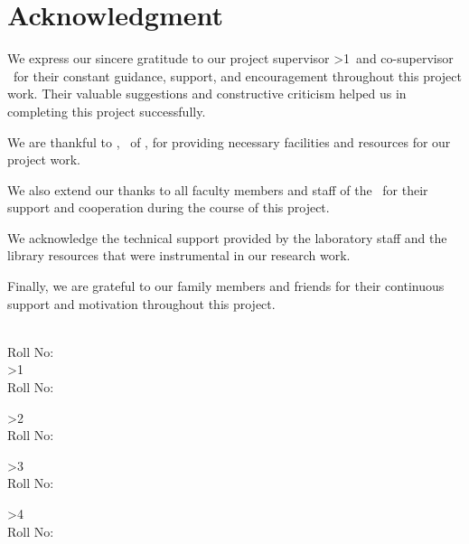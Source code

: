 

\chapter*{Acknowledgment}
\thispagestyle{plain}
\justifying 
We express our sincere gratitude to our project supervisor \textbf{\GetSupervisor}%
\ifnum\GetHasCoSupervisor>1\relax\ and co-supervisor \textbf{\GetCoSupervisor}\fi\ for their constant guidance, support, and encouragement throughout this project work. Their valuable suggestions and constructive criticism helped us in completing this project successfully.

We are thankful to \textbf{\GetHoD}, \GetHoDDesignation\ of \GetHoDDept, for providing necessary facilities and resources for our project work.

We also extend our thanks to all faculty members and staff of the \GetDepartment\ for their support and cooperation during the course of this project.

We acknowledge the technical support provided by the laboratory staff and the library resources that were instrumental in our research work.

Finally, we are grateful to our family members and friends for their continuous support and motivation throughout this project.

\vspace{2cm}

\begin{flushright}
	\GetStudentOne\\
	Roll No: \GetRollOne\\[1cm]
	
	\ifnum\GetNumberOfStudents>1\relax
	\GetStudentTwo\\
	Roll No: \GetRollTwo\\[1cm]
	\fi
	
	\ifnum\GetNumberOfStudents>2\relax
	\GetStudentThree\\
	Roll No: \GetRollThree\\[1cm]
	\fi
	
	\ifnum\GetNumberOfStudents>3\relax
	\GetStudentFour\\
	Roll No: \GetRollFour\\[1cm]
	\fi
	
	\ifnum\GetNumberOfStudents>4\relax
	\GetStudentFive\\
	Roll No: \GetRollFive\\
	\fi
\end{flushright}

\cleardoublepage